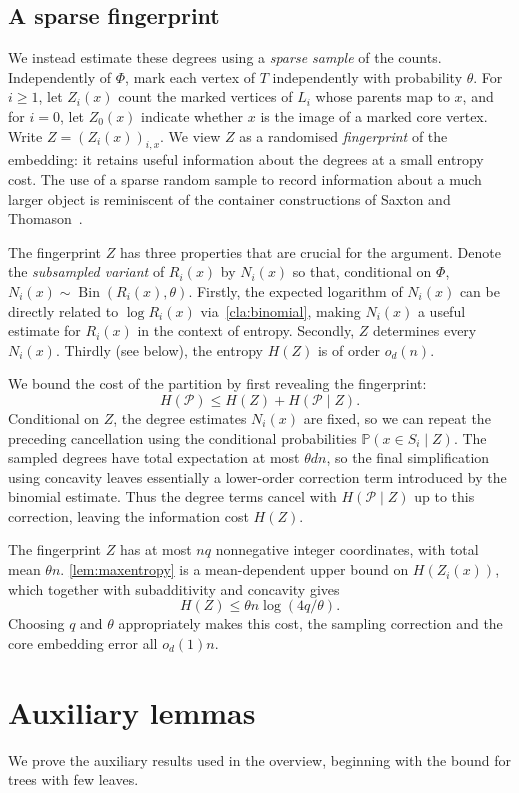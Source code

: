\documentclass[10pt,a4paper]{amsart}
\numberwithin{equation}{section}
\theoremstyle{definition}
\theoremstyle{remark}
\DeclareMathOperator{\Bin}{Bin}
\begin{document}
\subsection{A sparse fingerprint}\label{sec:fingerprint}
We instead estimate these degrees using a \textit{sparse sample} of the counts. Independently of $\Phi$, mark each vertex of $T$ independently with probability $\theta$. For $i\ge1$, let $Z_i(x)$ count the marked vertices of $L_i$ whose parents map to $x$, and for $i=0$, let $Z_0(x)$ indicate whether $x$ is the image of a marked core vertex. Write $Z=(Z_i(x))_{i,x}$. We view $Z$ as a randomised \emph{fingerprint} of the embedding:
it retains useful information about the degrees at a small
entropy cost. The use of a sparse random sample to record
information about a much larger object is reminiscent of
the container constructions of Saxton and
Thomason~\cite{SaxtonThomasonSimple}.

The fingerprint $Z$ has three properties that are crucial for the argument. Denote the \textit{subsampled variant} of $R_i(x)$ by  $N_i(x)$ so that, conditional on $\Phi$, $N_i(x) \sim \Bin (R_i(x), \theta)$. Firstly, the expected logarithm of $N_i(x)$ can be directly related to $\log R_i(x)$ via~\cref{cla:binomial}, making $N_i(x)$ a useful estimate for $R_i(x)$ in the context of entropy. Secondly, $Z$ determines every $N_i(x)$. Thirdly (see below), the entropy $H(Z)$ is of order $o_d(n)$.

We bound the cost of the partition by first revealing the fingerprint:
\[
    H(\mathcal P)\leq H(Z)+H(\mathcal P\mid Z).
\]
Conditional on $Z$, the degree estimates $N_i(x)$ are fixed, so we can repeat
the preceding cancellation using the conditional probabilities
$\mathbb P(x\in S_i\mid Z)$.
The sampled degrees have total expectation at most $\theta dn$,
so the final simplification using concavity leaves essentially a lower-order correction term introduced
by the binomial estimate.
Thus the degree terms cancel with $H(\mathcal P\mid Z)$ up to this
correction, leaving the information cost $H(Z)$.

The fingerprint $Z$ has at most $nq$ nonnegative integer coordinates, with total mean $\theta n$.  \cref{lem:maxentropy} is a mean-dependent upper bound on $H(Z_i(x))$, which together with subadditivity and concavity gives
\[H(Z)\leq \theta n\log(4q/\theta).\]
Choosing $q$ and $\theta$ appropriately makes this cost, the sampling correction and the core embedding error all $o_d(1)n$.


\section{Auxiliary lemmas}
    \label{sec:auxiliary}
We prove the auxiliary results used in the overview, beginning with the bound for trees with few leaves.
\end{document}
